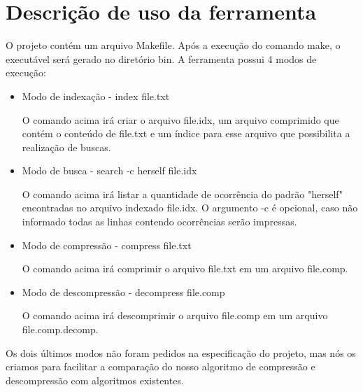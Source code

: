 \section{Descrição de uso da ferramenta \ipmt}

O projeto contém um arquivo Makefile. Após a execução do comando make, o
executável \ipmt será gerado no diretório bin. A ferramenta \ipmt possui 4 modos
de execução:

\begin{itemize}

\item Modo de indexação - \ipmt index file.txt

    O comando acima irá criar o arquivo file.idx, um arquivo comprimido que
    contém o conteúdo de file.txt e um índice para esse arquivo que possibilita
    a realização de buscas.

\item Modo de busca - \ipmt search -c herself file.idx

    O comando acima irá listar a quantidade de ocorrência do padrão "herself"
    encontradas no arquivo indexado file.idx. O argumento -c é opcional, caso
    não informado todas as linhas contendo ocorrências serão impressas.

\item Modo de compressão - \ipmt compress file.txt

    O comando acima irá comprimir o arquivo file.txt em um arquivo file.comp.

\item Modo de descompressão - \ipmt decompress file.comp

    O comando acima irá descomprimir o arquivo file.comp em um arquivo
    file.comp.decomp.

\end{itemize}

Os dois últimos modos não foram pedidos na especificação do projeto, mas nós os
criamos para facilitar a comparação do nosso algoritmo de compressão e
descompressão com algoritmos existentes.
